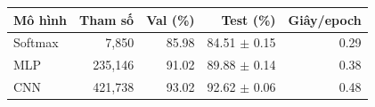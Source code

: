 \begin{tabularx}{\textwidth}{@{}Xrrrr@{}}
\toprule
Mô hình & Tham số & Val (\%) & Test (\%) & Giây/epoch \\
\midrule
Softmax & 7,850 & 85.98 & 84.51 $\pm$ 0.15 & 0.29 \\
MLP & 235,146 & 91.02 & 89.88 $\pm$ 0.14 & 0.38 \\
CNN & 421,738 & 93.02 & 92.62 $\pm$ 0.06 & 0.48 \\
\bottomrule
\end{tabularx}
